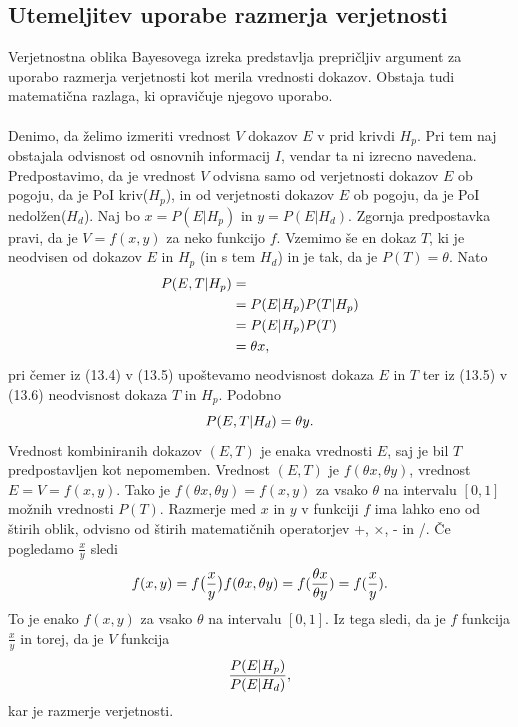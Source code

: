 \documentclass[mat1, tisk]{fmfdelo}
\theoremstyle{definition} %
\theoremstyle{trditev} %
\theoremstyle{izrek}
\begin{document}
\subsection{Utemeljitev uporabe razmerja verjetnosti}
Verjetnostna oblika Bayesovega izreka predstavlja prepričljiv argument za uporabo razmerja verjetnosti kot merila vrednosti dokazov.
Obstaja tudi matematična razlaga, ki opravičuje njegovo uporabo.\\\\
Denimo, da želimo izmeriti vrednost $V$ dokazov $E$ v prid krivdi $H_p$. Pri tem naj obstajala odvisnost od osnovnih informacij $I$, vendar ta ni izrecno
navedena. Predpostavimo, da je vrednost $V$ odvisna samo od verjetnosti dokazov $E$ ob pogoju, da je PoI kriv($H_p$), in od verjetnosti dokazov $E$ ob pogoju,
da je PoI nedolžen($H_d$). Naj bo $x=P(E \lvert H_p)$ in $y=P(E \lvert H_d)$. Zgornja predpostavka pravi, da je $V = f (x, y)$ za neko funkcijo $f$.
Vzemimo še en dokaz $T$, ki je neodvisen od dokazov $E$ in $H_p$ (in s tem $H_d$) in je tak, da je $P(T) = \theta$. Nato
\begin{align}
   P(E,T \lvert H_p) & = \\
   & = P(E \lvert H_p)P(T \lvert H_p) \\
   & = P(E \lvert H_p)P(T)\\
   & = \theta x, \vspace{2mm}
\end{align}
pri čemer iz (13.4) v (13.5) upoštevamo neodvisnost dokaza $E$ in $T$ ter iz (13.5) v (13.6) neodvisnost dokaza $T$ in $H_p$. Podobno
\[
   P(E,T \lvert H_d)  = \theta y. \vspace{2mm}
\]
Vrednost kombiniranih dokazov $(E, T)$ je enaka vrednosti $E$, saj je bil $T$ predpostavljen kot nepomemben. Vrednost $(E, T)$ je $f(\theta x, \theta y)$,
vrednost $E = V = f (x, y)$. Tako je $f(\theta x, \theta y) = f(x,y)$ za vsako $\theta$ na intervalu $[0,1]$ možnih vrednosti $P(T)$. Razmerje med
$x$ in $y$ v funkciji $f$ ima lahko eno od štirih oblik, odvisno od štirih matematičnih operatorjev +, ×, - in /. Če pogledamo $\frac{x}{y}$ sledi
\[
   f(x,y) = f \big(\frac{x}{y}\big)
   f(\theta x, \theta y) = f(\frac{\theta x}{\theta y}) = f(\frac{x}{y}). \vspace{2mm}
\]
To je enako $f(x,y)$ za vsako $\theta$ na intervalu $[0,1]$. Iz tega sledi, da je $f$ funkcija $\frac{x}{y}$ in torej, da je $V$ funkcija
\[
   \frac{P(E \lvert H_p)}{P(E \lvert H_d)}, \vspace{2mm}
\]
kar je razmerje verjetnosti.\\\\
\end{document}
